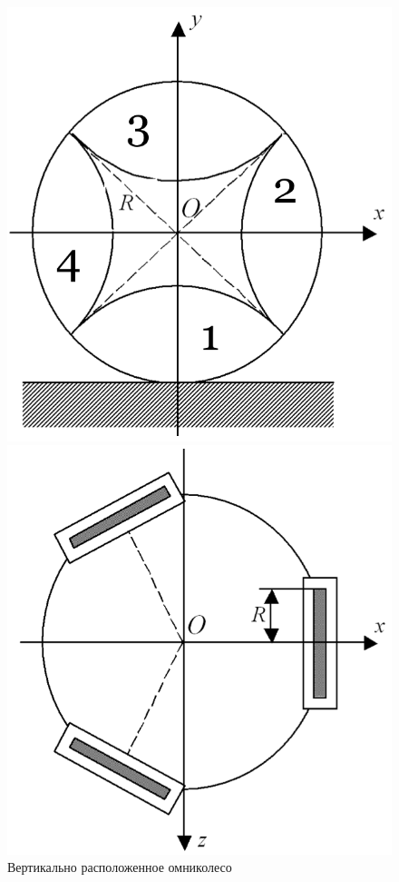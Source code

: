 \documentclass[12pt]{article}
\begin{document}
\begin{figure}
\centering
\begin{minipage}{.47\textwidth}
    \centering
    \includegraphics[width=\textwidth]{img/art/kos1_wheel_side.png}
    \caption{Вертикально расположенное омниколесо}
    \label{fig:kos1_wheel_side}
\end{minipage}%
\hspace{5pt}
\begin{minipage}{.47\textwidth}
    \centering
    \includegraphics[width=\textwidth]{img/art/kos2_vehicle.png}

\end{minipage}
\end{figure}
\end{document}
